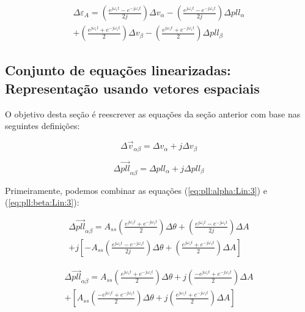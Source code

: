 \documentclass[12pt,a4paper]{report}
\begin{document}
\begin{multline}
\Delta\varepsilon_A =
\left(
\frac{e^{j\omega_1 t} - e^{-j\omega_1 t}}{2j}
\right) 
\Delta v_\alpha 
- \left(
\frac{e^{j\omega_1 t} - e^{-j\omega_1 t}}{2j}
\right)
\Delta pll_\alpha \\
+ \left(
\frac{e^{j\omega_1 t} + e^{-j\omega_1 t}}{2}
\right) 
\Delta v_\beta 
- \left(
\frac{e^{j\omega_1 t} + e^{-j\omega_1 t}}{2}
\right) 
\Delta pll_\beta
\label{eq:erro:amp:Lin:3}
\end{multline}




\subsection{Conjunto de equações linearizadas: Representação usando vetores espaciais}

O objetivo desta seção é reescrever as equações da seção anterior com base nas seguintes definições:

\begin{equation}
\Delta \vec{v}_{\alpha\beta}  = 
\Delta v_{\alpha} +
j \Delta v_{\beta}  
\end{equation}

\begin{equation}
\Delta \vec{pll}_{\alpha\beta}  = 
\Delta pll_{\alpha} +
j \Delta pll_{\beta}  
\end{equation}




Primeiramente, podemos combinar as equações (\ref{eq:pll:alpha:Lin:3}) e (\ref{eq:pll:beta:Lin:3}):

{
\color{blue}

\begin{multline}
\Delta \vec{pll}_{\alpha\beta} =
A_{ss} 
\left(
\frac{e^{j\omega_1 t} + e^{-j\omega_1 t}}{2}
\right)
\Delta \theta +
\left(
\frac{e^{j\omega_1 t} - e^{-j\omega_1 t}}{2j}
\right)
\Delta A \\ 
+ j\left[
- A_{ss} 
\left(
\frac{e^{j\omega_1 t} - e^{-j\omega_1 t}}{2j}
\right) 
\Delta \theta +
\left(
\frac{e^{j\omega_1 t} + e^{-j\omega_1 t}}{2}
\right)
\Delta A
\right]
\end{multline}



\begin{multline}
\Delta \vec{pll}_{\alpha\beta} =
A_{ss} 
\left(
\frac{e^{j\omega_1 t} + e^{-j\omega_1 t}}{2}
\right)
\Delta \theta +
j\left(
\frac{-e^{j\omega_1 t} + e^{-j\omega_1 t}}{2}
\right)
\Delta A \\ 
+ \left[
A_{ss} 
\left(
\frac{-e^{j\omega_1 t} + e^{-j\omega_1 t}}{2}
\right) 
\Delta \theta +
j \left(
\frac{e^{j\omega_1 t} + e^{-j\omega_1 t}}{2}
\right)
\Delta A
\right]
\end{multline}



}
\end{document}
